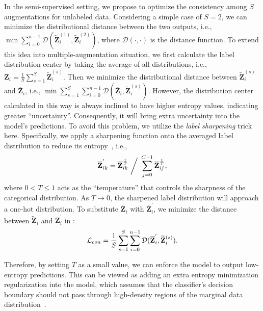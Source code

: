 { 
In the semi-supervised setting, we propose to optimize the consistency among $S$ augmentations for unlabeled data. Considering a simple case of $S=2$, we can
minimize the distributional distance between the two outputs, i.e.,
$
\min \sum_{i=0}^{n-1} \mathcal{D}(\widetilde{\mathbf{Z}}^{(1)}_i, \widetilde{\mathbf{Z}}^{(2)}_i)$,
where $ \mathcal{D}(\cdot,\cdot)$ is the distance function. 
To extend this idea into multiple-augmentation situation, we first 
calculate the label distribution center by taking the average of all distributions, i.e., 
 $ \overline{\mathbf{Z}}_i = \frac{1}{S}\sum_{s=1}^{S} \widetilde{\mathbf{Z}}_i^{(s)}$.
Then we minimize the distributional distance between $\widetilde{\mathbf{Z}}_i^{(s)}$ and $\overline{\mathbf{Z}}_i$, i.e., $\min \sum_{s=1}^{S}\sum_{i=0}^{n-1} \mathcal{D}(\overline{\mathbf{Z}}_i, \widetilde{\mathbf{Z}}^{(s)}_i)$.
However, the distribution center calculated in this way is always inclined to have higher entropy values, indicating greater ``uncertainty''. 
Consequently, it will bring extra uncertainty into the model's predictions. 
To avoid this problem, we utilize the \textit{label sharpening} trick here.
Specifically, we apply a sharpening function onto the averaged label distribution to reduce its entropy~\cite{berthelot2019mixmatch}, i.e.,
\begin{equation}
\small
\label{equ:sharpen}
\overline{\mathbf{Z}}^{'}_{ik} = \overline{\mathbf{Z}}_{ik}^{\frac{1}{T}} ~\bigg/~\sum_{j=0}^{C-1}\overline{\mathbf{Z}}_{ij}^{\frac{1}{T}},
\end{equation}
where $0< T\leq 1$ acts as the ``temperature'' that controls the sharpness of the categorical distribution. 
As $T \to 0$, the sharpened label distribution will approach a one-hot distribution. 
To substitute $\overline{\mathbf{Z}}_i$ with $\overline{\mathbf{Z}}^{'}_i$, we minimize the distance between  $\widetilde{\mathbf{Z}}_i$ and $\overline{\mathbf{Z}}^{'}_i$ in \model:
\begin{equation}
\small
\label{equ:consistency}
    \mathcal{L}_{con} =   \frac{1}{S}\sum_{s=1}^{S}\sum_{i=0}^{n-1} \mathcal{D}(\overline{\mathbf{Z}}^{'}_i, \widetilde{\mathbf{Z}}^{(s)}_i).
\end{equation}


Therefore, by setting $T$ as a small value, we can enforce the model to output low-entropy predictions. 
This can be viewed as adding an extra entropy minimization regularization into the model, which assumes that the classifier's decision boundary should not pass through high-density regions of the marginal data distribution~\cite{grandvalet2005semi}. 

}
